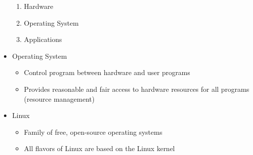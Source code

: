 \documentclass[12pt]{article}
\begin{document}
\begin{itemize}
        \begin{enumerate}
            \item Hardware
            \item Operating System
            \item Applications
        \end{enumerate}
        \item Operating System
        \begin{itemize}
            \item Control program between hardware and user programs
            \item Provides reasonable and fair access to hardware resources for all programs (resource management)
        \end{itemize}
        \item Linux
        \begin{itemize}
            \item Family of free, open-source operating systems
            \item All flavors of Linux are based on the Linux kernel
        \end{itemize}
    \end{itemize}
\end{document}

